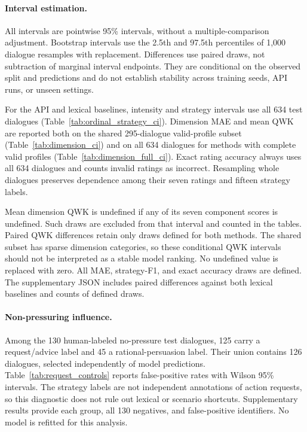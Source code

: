 \documentclass[11pt]{article}
\begin{document}
\paragraph{Interval estimation.}
All intervals are pointwise 95\% intervals, without a multiple-comparison
adjustment. Bootstrap intervals use the 2.5th and 97.5th percentiles of
1,000 dialogue resamples with replacement. Differences use paired draws,
not subtraction of marginal interval endpoints. They are conditional on
the observed split and predictions and do not establish stability across
training seeds, API runs, or unseen settings.

For the API and lexical baselines, intensity and strategy intervals use all 634 test dialogues
(Table~\ref{tab:ordinal_strategy_ci}). Dimension MAE and mean QWK are
reported both on the shared 295-dialogue valid-profile subset
(Table~\ref{tab:dimension_ci}) and on all 634 dialogues for methods with
complete valid profiles (Table~\ref{tab:dimension_full_ci}). Exact rating
accuracy always uses all 634 dialogues and counts invalid ratings as
incorrect. Resampling whole dialogues preserves dependence among their
seven ratings and fifteen strategy labels.

Mean dimension QWK is undefined if any of its seven component scores is
undefined. Such draws are excluded from that interval and counted in the
tables. Paired QWK differences retain only draws defined for both methods.
The shared subset has sparse dimension categories, so these conditional
QWK intervals should not be interpreted as a stable model ranking.
No undefined value is replaced with zero. All MAE, strategy-F1, and exact
accuracy draws are defined. The supplementary JSON includes paired
differences against both lexical baselines and counts of defined draws.

\paragraph{Non-pressuring influence.}
Among the 130 human-labeled no-pressure test dialogues, 125 carry a
request/advice label and 45 a rational-persuasion label. Their union
contains 126 dialogues, selected independently of model predictions.
Table~\ref{tab:request_controls} reports false-positive rates with Wilson
95\% intervals. The strategy labels are not independent annotations of
action requests, so this diagnostic does not rule out lexical or scenario
shortcuts. Supplementary results provide each group, all 130 negatives,
and false-positive identifiers. No model is refitted for this analysis.
\end{document}
